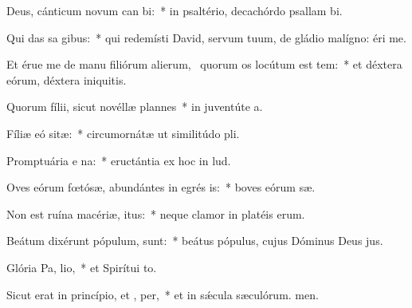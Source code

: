 \item Deus, cánticum novum can bi:~* in psaltério, decachórdo psallam bi.
\item Qui das sa gibus:~* qui redemísti David, servum tuum, de gládio malígno: éri me.
\item Et érue me de manu filiórum alierum,~\pscross{} quorum os locútum est tem:~* et déxtera eórum, déxtera iniquitis.
\item Quorum fílii, sicut novéllæ plannes~* in juventúte a.
\item Fíliæ eó sitæ:~* circumornátæ ut similitúdo pli.
\item Promptuária e na:~* eructántia ex hoc in lud.
\item Oves eórum fœtósæ, abundántes in egrés is:~* boves eórum sæ.
\item Non est ruína macériæ,  itus:~* neque clamor in platéis erum.
\item Beátum dixérunt pópulum,   sunt:~* beátus pópulus, cujus Dóminus Deus jus.
\item Glória Pa,  lio,~* et Spirítui to.
\item Sicut erat in princípio, et ,  per,~* et in sǽcula sæculórum. men.
